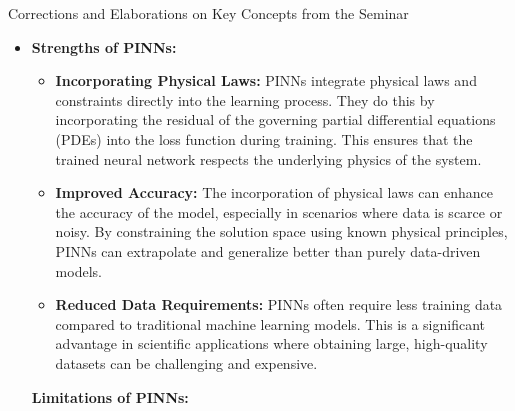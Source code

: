 \documentclass[
]{article}
\author{}
\date{}
\begin{document}
{Corrections and Elaborations on Key Concepts from the
Seminar}\label{corrections-and-elaborations-on-key-concepts-from-the-seminar}

\begin{itemize}
\item
  \textbf{Strengths of PINNs:}

  \begin{itemize}
  
  \item
    \textbf{Incorporating Physical Laws:} PINNs integrate physical laws
    and constraints directly into the learning process. They do this by
    incorporating the residual of the governing partial differential
    equations (PDEs) into the loss function during training. This
    ensures that the trained neural network respects the underlying
    physics of the system.
  \item
    \textbf{Improved Accuracy:} The incorporation of physical laws can
    enhance the accuracy of the model, especially in scenarios where
    data is scarce or noisy. By constraining the solution space using
    known physical principles, PINNs can extrapolate and generalize
    better than purely data-driven models.
  \item
    \textbf{Reduced Data Requirements:} PINNs often require less
    training data compared to traditional machine learning models. This
    is a significant advantage in scientific applications where
    obtaining large, high-quality datasets can be challenging and
    expensive.
  \end{itemize}

  \textbf{Limitations of PINNs:}

  \begin{itemize}
  

\end{itemize}
\end{itemize}
\end{document}
